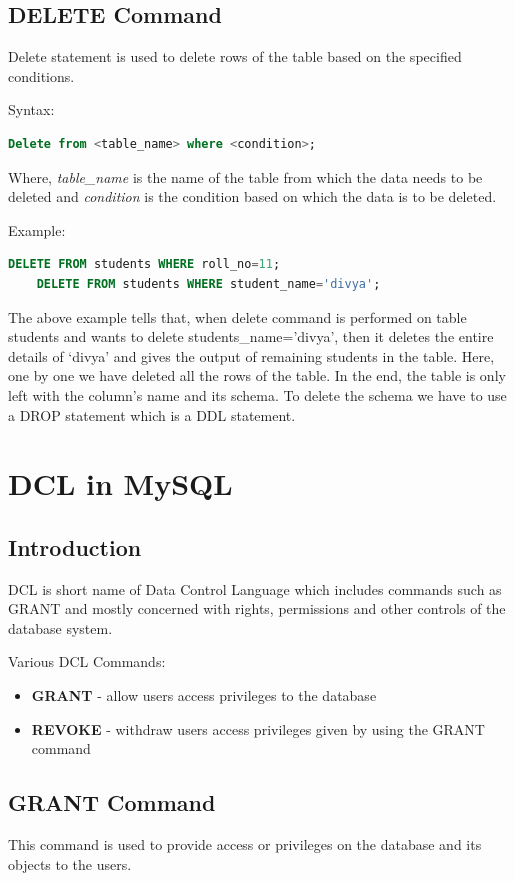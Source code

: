 \section{DELETE Command}
Delete statement is used to delete rows of the table based on the specified conditions.

Syntax:
\begin{lstlisting}[language=sql]
	Delete from <table_name> where <condition>;
\end{lstlisting}
Where, \textit{table\_name} is the name of the table from which the data needs to be deleted and \textit{condition} is the condition based on which the data is to be deleted.

Example:
\begin{lstlisting}[language=sql]
	DELETE FROM students WHERE roll_no=11;
	DELETE FROM students WHERE student_name='divya';	
\end{lstlisting}

The above example tells that, when delete command is performed on table students and wants to delete students\_name=’divya’, then it deletes the entire details of ‘divya’ and gives the output of remaining students in the table. Here, one by one we have deleted all the rows of the table. In the end, the table is only left with the column’s name and its schema. To delete the schema we have to use a DROP statement which is a DDL statement.



\chapter{DCL in MySQL}

\section{Introduction}
DCL is short name of Data Control Language which includes commands such as GRANT and mostly concerned with rights, permissions and other controls of the database system.

Various DCL Commands:
\begin{itemize}
	\tightlist
	\item \textbf{GRANT} - allow users access privileges to the database
	\item \textbf{REVOKE} - withdraw users access privileges given by using the GRANT command	
\end{itemize}

\section{GRANT Command}
This command is used to provide access or privileges on the database and its objects to the users.


